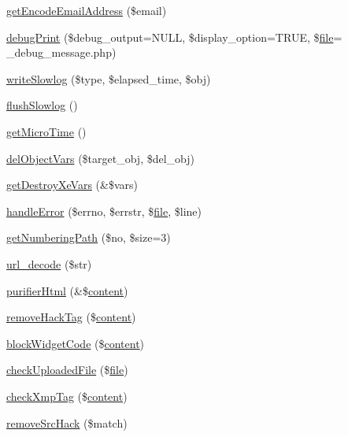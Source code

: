 \begin{DoxyCompactItemize}
\item 
\hyperlink{func_8inc_8php_a3ec2d6f22b5d041d959d1c56967b13ce}{get\+Encode\+Email\+Address} (\$email)
\item 
\hyperlink{func_8inc_8php_a84792ec82f804a0b3b60b75bb803ebd5}{debug\+Print} (\$debug\+\_\+output=N\+U\+L\+L, \$display\+\_\+option=T\+R\+U\+E, \$\hyperlink{classfile}{file}= \textquotesingle{}\+\_\+debug\+\_\+message.\+php\textquotesingle{})
\item 
\hyperlink{func_8inc_8php_ad04b6facc446291dbbb292553250a4a6}{write\+Slowlog} (\$type, \$elapsed\+\_\+time, \$obj)
\item 
\hyperlink{func_8inc_8php_aafb6a81a912bf5b857fdc1e8528bc853}{flush\+Slowlog} ()
\item 
\hyperlink{func_8inc_8php_a83ff2cccfdfaf38ba29c8c6d04586deb}{get\+Micro\+Time} ()
\item 
\hyperlink{func_8inc_8php_a9ee9f577ae4c2fe0ee8565ba3dd64adc}{del\+Object\+Vars} (\$target\+\_\+obj, \$del\+\_\+obj)
\item 
\hyperlink{func_8inc_8php_a563d33afe37e2b440a2f4500f58eeb64}{get\+Destroy\+Xe\+Vars} (\&\$vars)
\item 
\hyperlink{func_8inc_8php_a4d13a097a6f6c56eadda408e9af13497}{handle\+Error} (\$errno, \$errstr, \$\hyperlink{classfile}{file}, \$line)
\item 
\hyperlink{func_8inc_8php_ae1a0ad24dbf34de227ffd2eb0d1f8da3}{get\+Numbering\+Path} (\$no, \$size=3)
\item 
\hyperlink{func_8inc_8php_a02ee51ef0a2362e75837547700dc4f84}{url\+\_\+decode} (\$str)
\item 
\hyperlink{func_8inc_8php_af8504615daee340af724f099cc69662f}{purifier\+Html} (\&\$\hyperlink{classcontent}{content})
\item 
\hyperlink{func_8inc_8php_abde22c0ee89dfd569abd1e338b3b2cf5}{remove\+Hack\+Tag} (\$\hyperlink{classcontent}{content})
\item 
\hyperlink{func_8inc_8php_a3e4480709a0bb53f6478ae6521cda6f3}{block\+Widget\+Code} (\$\hyperlink{classcontent}{content})
\item 
\hyperlink{func_8inc_8php_a771c122bb7a5b7038f7f751f5e2129b9}{check\+Uploaded\+File} (\$\hyperlink{classfile}{file})
\item 
\hyperlink{func_8inc_8php_a2095695afd9791bcab30bc8b53a68046}{check\+Xmp\+Tag} (\$\hyperlink{classcontent}{content})
\item 
\hyperlink{func_8inc_8php_aac01d80c0a850100a25ae023b78e6b7c}{remove\+Src\+Hack} (\$match)
\item 

\end{DoxyCompactItemize}
